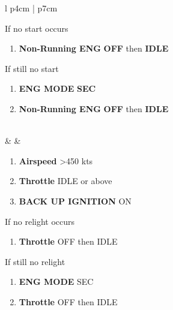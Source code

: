 \documentclass[8pt,usenames,dvipsnames,twoside]{article}
\begin{document}
\begin{center}
\begin{longtable}{l p{4cm} | p{7cm}}
\begin{minipage}[t]{\linewidth}
\begin{enumerate}[label=(\alph*)]
					\end{enumerate}
					\vspace{-7pt}
					If no start occurs
					\begin{enumerate}[label=(\alph*), resume]
						\vspace{-7pt}
						\item \textbf{Non-Running ENG} \dotfill \textbf{OFF} then \textbf{IDLE}
					\end{enumerate}
					\vspace{-7pt}
					If still no start
					\begin{enumerate}[label=(\alph*), resume]
						\vspace{-7pt}
						\item \textbf{ENG MODE} \dotfill \textbf{SEC}
						\item \textbf{Non-Running ENG} \dotfill \textbf{OFF} then \textbf{IDLE}
					\end{enumerate}
				\end{minipage} \\
				\midrule
				\textbullet &  &
				\begin{minipage}[t]{\linewidth}
					\vspace{-7pt}
					\begin{enumerate}[label=(\alph*)]
						\item \textbf{Airspeed} \dotfill >450 kts
						\item \textbf{Throttle} \dotfill IDLE or above
						\item \textbf{BACK UP IGNITION} \dotfill ON
					\end{enumerate}
					\vspace{-7pt}
					If no relight occurs
					\begin{enumerate}[label=(\alph*), resume]
						\vspace{-7pt}
						\item \textbf{Throttle} \dotfill OFF then IDLE
					\end{enumerate}
					\vspace{-7pt}
					If still no relight
					\begin{enumerate}[label=(\alph*), resume]
						\vspace{-7pt}
						\item \textbf{ENG MODE} \dotfill SEC
						\item \textbf{Throttle} \dotfill OFF then IDLE
					\end{enumerate}
				\end{minipage} \\

\end{longtable}
\end{center}
\end{document}
